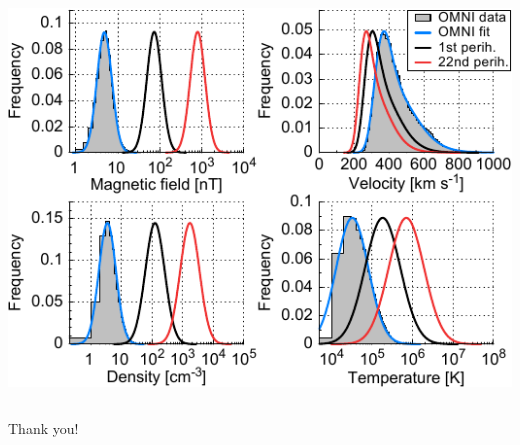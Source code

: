 \documentclass[11pt,aspectratio=1610]{beamer}	%
\newcommand{\captionoftiny}[2]{\captionof{#1}{\color{gray} \tiny #2}}
\begin{document}
\begin{frame}[c]{}{}
	\begin{columns}[c]
		
		\includegraphics[width=\textwidth]{../figures_paper/SPP_sw_distributions_b.pdf}


	\end{columns}
\end{frame}

\begin{frame}[c]{Thank you!}{}
	\begin{columns}[c]
		

	\end{columns}
\end{frame}
\end{document}

